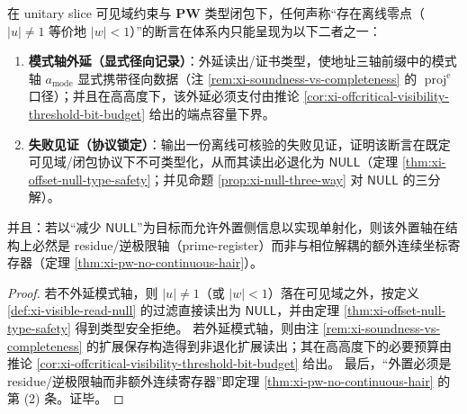 \begin{proposition}\label{prop:xi-offcritical-falsifiable-restatement}
在 unitary slice 可见域约束与 \(\mathbf{PW}\) 类型闭包下，任何声称“存在离线零点（\(|u|\neq 1\) 等价地 \(|w|<1\)）”的断言在体系内只能呈现为以下二者之一：
\begin{enumerate}
  \item \textbf{模式轴外延（显式径向记录）}：外延读出/证书类型，使地址三轴前缀中的模式轴 \(a_{\mathrm{mode}}\) 显式携带径向数据（注 \ref{rem:xi-soundness-vs-completeness} 的 \(\operatorname{proj}^{\mathrm e}\) 口径）；并且在高高度下，该外延必须支付由推论 \ref{cor:xi-offcritical-visibility-threshold-bit-budget} 给出的端点容量下界。
  \item \textbf{失败见证（协议锁定）}：输出一份离线可核验的失败见证，证明该断言在既定可见域/闭包协议下不可类型化，从而其读出必退化为 \(\mathsf{NULL}\)（定理 \ref{thm:xi-offset-null-type-safety}；并见命题 \ref{prop:xi-null-three-way} 对 \(\mathsf{NULL}\) 的三分解）。
\end{enumerate}
并且：若以“减少 \(\mathsf{NULL}\)”为目标而允许外置侧信息以实现单射化，则该外置轴在结构上必然是 residue/逆极限轴（prime-register）而非与相位解耦的额外连续坐标寄存器（定理 \ref{thm:xi-pw-no-continuous-hair}）。
\end{proposition}

\begin{proof}
若不外延模式轴，则 \(|u|\neq 1\)（或 \(|w|<1\)）落在可见域之外，按定义 \ref{def:xi-visible-read-null} 的过滤直接读出为 \(\mathsf{NULL}\)，并由定理 \ref{thm:xi-offset-null-type-safety} 得到类型安全拒绝。
若外延模式轴，则由注 \ref{rem:xi-soundness-vs-completeness} 的扩展保存构造得到非退化扩展读出；其在高高度下的必要预算由推论 \ref{cor:xi-offcritical-visibility-threshold-bit-budget} 给出。
最后，“外置必须是 residue/逆极限轴而非额外连续寄存器”即定理 \ref{thm:xi-pw-no-continuous-hair} 的第 (2) 条。证毕。
\end{proof}

